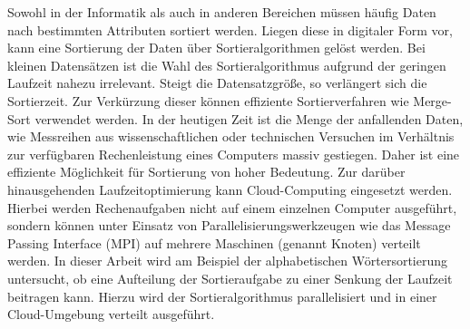 Sowohl in der Informatik als auch in anderen Bereichen müssen häufig Daten nach bestimmten Attributen sortiert werden. Liegen diese in digitaler Form vor, kann eine Sortierung der Daten über Sortieralgorithmen gelöst werden. Bei kleinen Datensätzen ist die Wahl des Sortieralgorithmus aufgrund der geringen Laufzeit nahezu irrelevant. Steigt die Datensatzgröße, so verlängert sich die Sortierzeit. Zur Verkürzung dieser können effiziente Sortierverfahren wie Merge-Sort verwendet werden. In der heutigen Zeit ist die Menge der anfallenden Daten, wie Messreihen aus wissenschaftlichen oder technischen Versuchen im Verhältnis zur verfügbaren Rechenleistung eines Computers massiv gestiegen. Daher ist eine effiziente Möglichkeit für Sortierung von hoher Bedeutung. Zur darüber hinausgehenden Laufzeitoptimierung kann Cloud-Computing eingesetzt werden. Hierbei werden Rechenaufgaben nicht auf einem einzelnen Computer ausgeführt, sondern können unter Einsatz von Parallelisierungswerkzeugen wie das Message Passing Interface (MPI) auf mehrere Maschinen (genannt Knoten) verteilt werden. In dieser Arbeit wird am Beispiel der alphabetischen Wörtersortierung untersucht, ob eine Aufteilung der Sortieraufgabe zu einer Senkung der Laufzeit beitragen kann. Hierzu wird der Sortieralgorithmus parallelisiert und in einer Cloud-Umgebung verteilt ausgeführt.